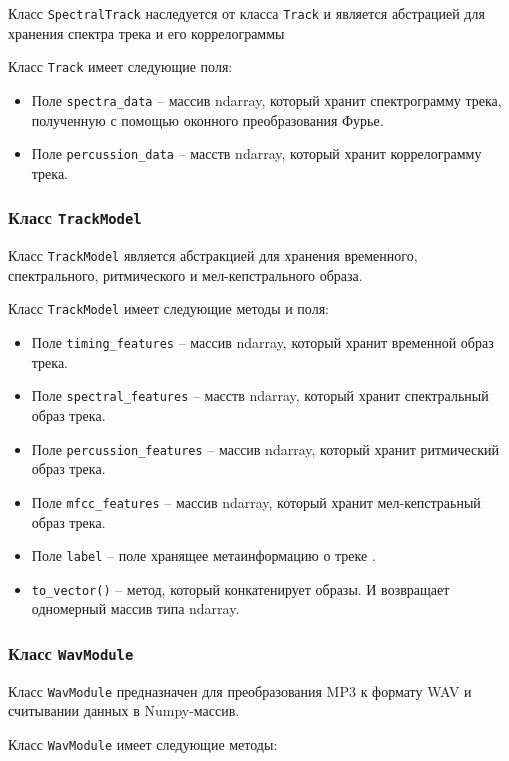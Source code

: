 Класс \texttt{SpectralTrack} наследуется от класса  \texttt{Track}  и  является абстрацией для хранения  спектра трека и его коррелограммы

Класс \texttt{Track} имеет следующие  поля:
\begin{itemize}
\item{Поле \texttt{spectra\_data} -- массив ndarray, который хранит спектрограмму трека, полученную с помощью оконного преобразования Фурье.}
\item{Поле \texttt{percussion\_data} -- масств ndarray, который хранит коррелограмму трека.}
\end{itemize}

\subsubsection{Класс \texttt{TrackModel}}

Класс \texttt{TrackModel} является абстракцией для хранения временного, спектрального, ритмического и мел-кепстрального образа.

Класс \texttt{TrackModel} имеет следующие  методы и поля:

\begin{itemize}
\item{Поле \texttt{timing\_features} -- массив ndarray, который хранит временной образ трека.}
\item{Поле \texttt{spectral\_features} -- масств ndarray, который хранит спектральный образ трека.}
\item{Поле \texttt{percussion\_features} -- массив ndarray, который хранит ритмический образ трека.}
\item{Поле \texttt{mfcc\_features} -- массив ndarray, который хранит мел-кепстраьный образ трека.}
\item{Поле \texttt{label} -- поле хранящее метаинформацию о треке .}
\item{\texttt{to\_vector()} -- метод, который конкатенирует образы. И возвращает одномерный массив типа ndarray.}
\end{itemize}


\subsubsection{Класс \texttt{WavModule}}

Класс \texttt{WavModule} предназначен для преобразования MP3 к формату WAV и считывании данных в Numpy-массив. 

Класс \texttt{WavModule} имеет следующие методы:

